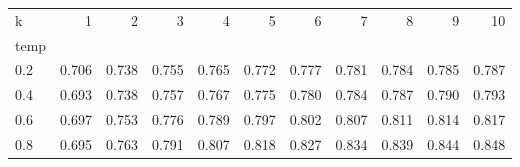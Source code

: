 \begin{tabular}{lrrrrrrrrrr}
\toprule
k & 1 & 2 & 3 & 4 & 5 & 6 & 7 & 8 & 9 & 10 \\
temp &  &  &  &  &  &  &  &  &  &  \\
\midrule
0.2 & 0.706 & 0.738 & 0.755 & 0.765 & 0.772 & 0.777 & 0.781 & 0.784 & 0.785 & 0.787 \\
0.4 & 0.693 & 0.738 & 0.757 & 0.767 & 0.775 & 0.780 & 0.784 & 0.787 & 0.790 & 0.793 \\
0.6 & 0.697 & 0.753 & 0.776 & 0.789 & 0.797 & 0.802 & 0.807 & 0.811 & 0.814 & 0.817 \\
0.8 & 0.695 & 0.763 & 0.791 & 0.807 & 0.818 & 0.827 & 0.834 & 0.839 & 0.844 & 0.848 \\
\bottomrule
\end{tabular}
